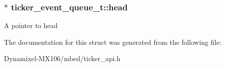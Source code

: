 \subsubsection[{\texorpdfstring{head}{head}}]{$\ast$ ticker\+\_\+event\+\_\+queue\+\_\+t\+::head}\hypertarget{structticker__event__queue__t_a82f921674b4b3f8a5315f26200a9db11}{}\label{structticker__event__queue__t_a82f921674b4b3f8a5315f26200a9db11}
A pointer to head 

The documentation for this struct was generated from the following file\+:\begin{DoxyCompactItemize}
\item 
Dynamixel-\/\+M\+X106/mbed/ticker\+\_\+api.\+h\end{DoxyCompactItemize}
